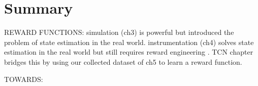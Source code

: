 \documentclass[\home/main.tex]{subfiles}
\begin{document}
\chapter{Summary}



REWARD FUNCTIONS: 
    simulation (ch3) is powerful but introduced the problem of state estimation in the real world.
    instrumentation (ch4) solves state estimation in the real world but still requires reward engineering .
    TCN chapter bridges this by using our collected dataset of ch5 to learn a reward function.   

TOWARDS:
\end{document}

